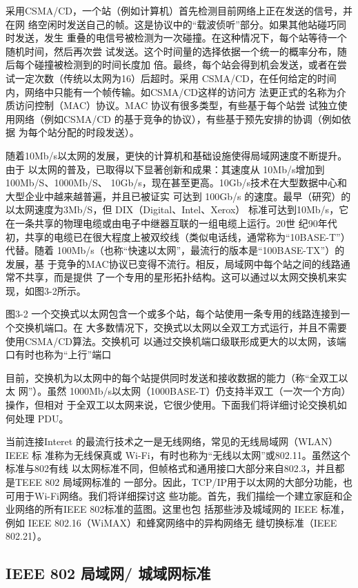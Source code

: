 采用CSMA/CD，一个站（例如计算机）首先检测目前网络上正在发送的信号，并在网
络空闲时发送自己的帧。这是协议中的“载波侦听”部分。如果其他站碰巧同时发送，发生
重叠的电信号被检测为一次碰撞。在这种情况下，每个站等待一个随机时间，然后再次尝
试发送。这个时间量的选择依据一个统一的概率分布，随后每个碰撞被检测到的时间长度加
倍。最终，每个站会得到机会发送，或者在尝试一定次数（传统以太网为16）后超时。采用
CSMA/CD，在任何给定的时间内，网络中只能有一个帧传输。如CSMA/CD这样的访问方
法更正式的名称为介质访问控制（MAC）协议。MAC 协议有很多类型，有些基于每个站尝
试独立使用网络（例如CSMA/CD 的基于竞争的协议），有些基于预先安排的协调（例如依据
为每个站分配的时段发送）。

随着10Mb/s以太网的发展，更快的计算机和基础设施使得局域网速度不断提升。由于
以太网的普及，已取得以下显著创新和成果：其速度从 10Mb/s增加到 100Mb/S、1000Mb/S、
10Gb/s，现在甚至更高。10Gb/s技术在大型数据中心和大型企业中越来越普遍，并且已被证实
可达到 100Gb/s 的速度。最早（研究）的以太网速度为3Mb/S，但 DIX（Digital、Intel、Xerox）
标准可达到10Mb/s，它在一条共享的物理电缆或由电子中继器互联的一组电缆上运行。20世
纪90年代初，共享的电缆已在很大程度上被双绞线（类似电话线，通常称为“10BASE-T”）
代替。随着 100Mb/s（也称“快速以太网”，最流行的版本是“100BASE-TX”）的发展，基
于竞争的MAC协议已变得不流行。相反，局域网中每个站之间的线路通常不共享，而是提供
了一个专用的星形拓扑结构。这可以通过以太网交换机来实现，如图3-2所示。

图3-2 一个交换式以太网包含一个或多个站，每个站使用一条专用的线路连接到一个交换机端口。在
大多数情况下，交换式以太网以全双工方式运行，并且不需要使用CSMA/CD算法。交换机可
以通过交换机端口级联形成更大的以太网，该端口有时也称为“上行”端口

目前，交换机为以太网中的每个站提供同时发送和接收数据的能力（称“全双工以太
网”）。虽然 1000Mb/s以太网（1000BASE-T）仍支持半双工（一次一个方向）操作，但相对
于全双工以太网来说，它很少使用。下面我们将详细讨论交换机如何处理 PDU。

当前连接Interet 的最流行技术之一是无线网络，常见的无线局域网（WLAN） IEEE 标
准称为无线保真或 Wi-Fi，有时也称为“无线以太网”或802.11。虽然这个标准与802有线
以太网标准不同，但帧格式和通用接口大部分来自802.3，并且都是TEEE 802 局域网标准的
一部分。因此，TCP/IP用于以太网的大部分功能，也可用于Wi-Fi网络。我们将详细探讨这
些功能。首先，我们描绘一个建立家庭和企业网络的所有IEEE 802标准的蓝图。这里也包
括那些涉及城域网的 IEEE 标准，例如 IEEE 802.16（WiMAX）和蜂窝网络中的异构网络无
缝切换标准（IEEE 802.21）。

\subsection{IEEE 802 局域网/ 城域网标准}

